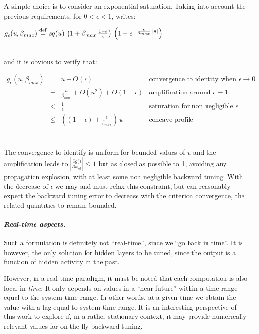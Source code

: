 A simple choice is to consider an exponential saturation. Taking into account the previous requirements, for $0 < \epsilon < 1$, writes:
\\\centerline{$g_{\epsilon}(u, \beta_{max}) \stackrel {\rm def}{=}  sg(u) \, \left(1 + \beta_{max}\,\frac{1-\epsilon}{\epsilon}\right) \, \left(1 - e^{-\frac{\epsilon}{\beta_{max}} \, |u|}\right)$}\\
and it is obvious to verify that:
\\\centerline{$\begin{array}{rcll} g_{\epsilon}(u, \beta_{max}) 
 &=& u + O(\epsilon) & \mbox{convergence to identity when $\epsilon \rightarrow 0$} \\
 &=& \frac{u}{\beta_{max}} + O(u^2) + O(1 - \epsilon) & \mbox{amplification around $\epsilon = 1$} \\
 &<& \frac{1}{\epsilon} & \mbox{saturation for non negligible $\epsilon$} \\
 &\leq& \left((1 - \epsilon) + \frac{\epsilon}{\beta_{max}}\right) \, u & \mbox{concave profile} \\
\end{array}$}\\
The convergence to identify is uniform for bounded values of $u$ and the amplification leads to $\left|\frac{\partial g(\dot)}{\partial \kappa_{nt}}\right| \leq 1$ but as closed as possible to 1, avoiding any propagation explosion, with at least some non negligible backward tuning. With the decrease of $\epsilon$ we may and must relax this constraint, but can reasonably expect the backward tuning error to decrease with the criterion convergence, the related quantities to remain bounded.

\paragraph{\em Real-time aspects.}

Such a formulation is definitely not ``real-time'', since we ``go back in time''. It is however, the only solution for hidden layers to be tuned, since the output is a function of hidden activity in the past. 

However, in a real-time paradigm, it must be noted that each computation is also local in {\em time}: It only depends on values in a ``near future'' within a time range equal to the system time range. In other words, at a given time we obtain the value with a lag equal to system time-range. It is an interesting perspective of this work to explore if, in a rather stationary context, it may provide numerically relevant values for on-the-fly backward tuning.

